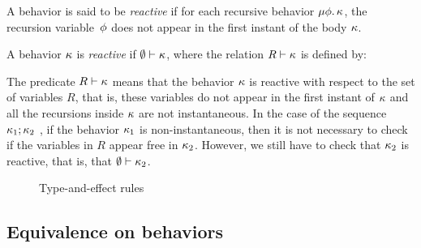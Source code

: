 \documentclass[9pt,preprint]{sigplanconf}
\begin{document}
A behavior is said to be \emph{reactive}  if for each recursive behavior $\mu \phi.\, \kappa$, the recursion variable~$\phi$ does not appear in the first instant of the body $\kappa$. 
\begin{definition}
\label{def:reactive_behavior}
A behavior $\kappa$ is \emph{reactive} if $\emptyset \vdash \kappa$, where the relation $R \vdash \kappa$ is defined by:

\end{definition}
The predicate \mbox{$R \vdash \kappa$} means that the behavior $\kappa$ is reactive with respect to the set of variables $R$, that is, these variables do not appear in the first instant of $\kappa$ and all the recursions inside $\kappa$ are not instantaneous. 
In the case of the sequence $\kappa_1 ; \kappa_2$ , if the behavior $\kappa_1$ is non-instantaneous, then it is not necessary to check if the variables in $R$ appear free in $\kappa_2$. However, we still have to check that $\kappa_2$ is reactive, that is, that $\emptyset \vdash \kappa_2$.

%
%
%

\begin{figure*}[t]


\caption{Type-and-effect rules}
\label{fig:rules}
\end{figure*}

\subsection{Equivalence on behaviors}
\label{sec:equiv_behaviors}
\end{document}
